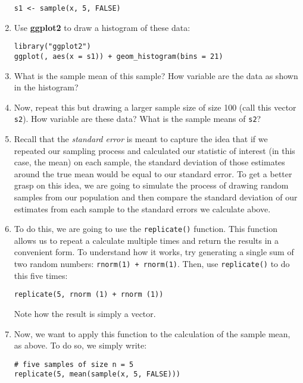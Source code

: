 \documentclass[a4paper,12pt]{article}
\begin{document}
\begin{enumerate}
\begin{verbatim}
s1 <- sample(x, 5, FALSE)
\end{verbatim}

\item Use \textbf{ggplot2} to draw a histogram of these data:

\begin{verbatim}
library("ggplot2")
ggplot(, aes(x = s1)) + geom_histogram(bins = 21)
\end{verbatim}

\item What is the sample mean of this sample? How variable are the data as shown in the histogram?

\item Now, repeat this but drawing a larger sample size of size 100 (call this vector \texttt{s2}). How variable are these data? What is the sample means of \texttt{s2}?

\item Recall that the \textit{standard error} is meant to capture the idea that if we repeated our sampling process and calculated our statistic of interest (in this case, the mean) on each sample, the standard deviation of those estimates around the true mean would be equal to our standard error. To get a better grasp on this idea, we are going to simulate the process of drawing random samples from our population and then compare the standard deviation of our estimates from each sample to the standard errors we calculate above.

\item To do this, we are going to use the \texttt{replicate()} function. This function allows us to repeat a calculate multiple times and return the results in a convenient form. To understand how it works, try generating a single sum of two random numbers: \texttt{rnorm(1) + rnorm(1)}. Then, use \texttt{replicate()} to do this five times:

\begin{verbatim}
replicate(5, rnorm (1) + rnorm (1))
\end{verbatim}

\noindent Note how the result is simply a vector.

\item Now, we want to apply this function to the calculation of the sample mean, as above. To do so, we simply write:

\begin{verbatim}
# five samples of size n = 5
replicate(5, mean(sample(x, 5, FALSE)))


\end{verbatim}
\end{enumerate}
\end{document}
